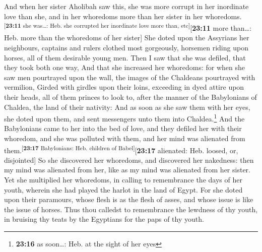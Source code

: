  And when her sister Aholibah saw this, she was more
corrupt in her inordinate love than she, and in her whoredoms more than
her sister in her whoredoms.\textsuperscript{{[}\textbf{23:11} she
was\ldots: Heb. she corrupted her inordinate love more than,
etc{]}}{[}\textbf{23:11} more than\ldots: Heb. more than the whoredoms
of her sister{]}  She doted upon the Assyrians her
neighbours, captains and rulers clothed most gorgeously, horsemen riding
upon horses, all of them desirable young men.  Then I saw
that she was defiled, that they took both one way,  And
that she increased her whoredoms: for when she saw men pourtrayed upon
the wall, the images of the Chaldeans pourtrayed with vermilion,
 Girded with girdles upon their loins, exceeding in dyed
attire upon their heads, all of them princes to look to, after the
manner of the Babylonians of Chaldea, the land of their nativity:
 And as soon as she saw them with her eyes, she doted
upon them, and sent messengers unto them into Chaldea.\footnote{\textbf{23:16}
  as soon\ldots: Heb. at the sight of her eyes}  And the
Babylonians came to her into the bed of love, and they defiled her with
their whoredom, and she was polluted with them, and her mind was
alienated from them.\textsuperscript{{[}\textbf{23:17} Babylonians: Heb.
children of Babel{]}}{[}\textbf{23:17} alienated: Heb. loosed, or,
disjointed{]}  So she discovered her whoredoms, and
discovered her nakedness: then my mind was alienated from her, like as
my mind was alienated from her sister.  Yet she
multiplied her whoredoms, in calling to remembrance the days of her
youth, wherein she had played the harlot in the land of Egypt.
 For she doted upon their paramours, whose flesh is as
the flesh of asses, and whose issue is like the issue of horses.
 Thus thou calledst to remembrance the lewdness of thy
youth, in bruising thy teats by the Egyptians for the paps of thy youth.

